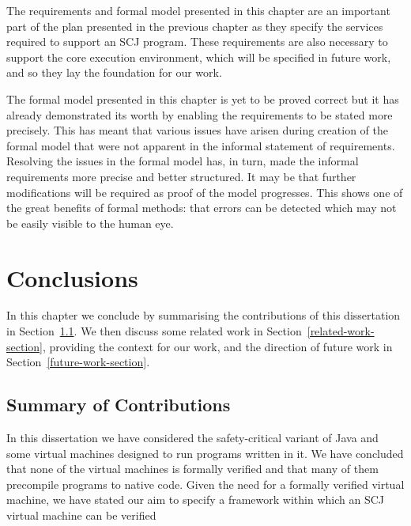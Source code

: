 \documentclass[a4paper,10pt]{report}
\begin{document}
The requirements and formal model presented in this chapter are an important
part of the plan presented in the previous chapter as they specify the services
required to support an SCJ program.  These requirements are also necessary to
support the core execution environment, which will be specified in future work,
and so they lay the foundation for our work.

The formal model presented in this chapter is yet to be proved correct but it
has already demonstrated its worth by enabling the requirements to be stated
more precisely.  This has meant that various issues have arisen during creation
of the formal model that were not apparent in the informal statement of
requirements.  Resolving the issues in the formal model has, in turn, made the
informal requirements more precise and better structured.  It may be that
further modifications will be required as proof of the model progresses.  This
shows one of the great benefits of formal methods: that errors can be detected
which may not be easily visible to the human eye.


\chapter{Conclusions}
\label{conclusions-chapter}

In this chapter we conclude by summarising the contributions of this
dissertation in Section~\ref{summary-section}.  We then discuss some related
work in Section~\ref{related-work-section}, providing the context for our work,
and the direction of future work in Section~\ref{future-work-section}.

\section{Summary of Contributions}
\label{summary-section}

In this dissertation we have considered the safety-critical variant of Java and
some virtual machines designed to run programs written in it.  We have concluded
that none of the virtual machines is formally verified and that many of them
precompile programs to native code.  Given the need for a formally verified
virtual machine, we have stated our aim to specify a framework within which an
SCJ virtual machine can be verified
\end{document}
